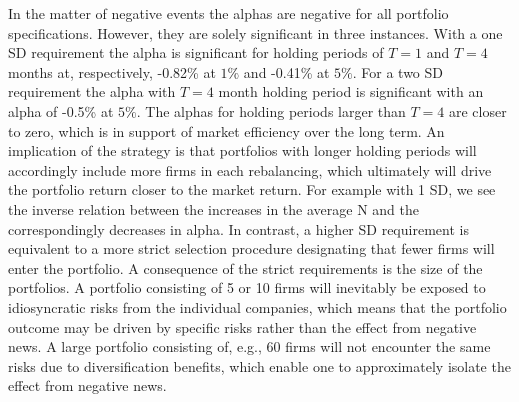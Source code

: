 In the matter of negative events the alphas are negative for all portfolio specifications. However, they are solely significant in three instances. With a one SD requirement the alpha is significant for holding periods of $T = 1$ and $T = 4$ months at, respectively, -0.82\% at $1\%$ and -0.41\% at $5\%$. For a two SD requirement the alpha with $T=4$ month holding period is significant with an alpha of -0.5\% at $5\%$. The alphas for holding periods larger than $T = 4$ are closer to zero, which is in support of market efficiency over the long term. An implication of the strategy is that portfolios with longer holding periods will accordingly include more firms in each rebalancing, which ultimately will drive the portfolio return closer to the market return. For example with 1 SD, we see the inverse relation between the increases in the average N and the correspondingly decreases in alpha. In contrast, a higher SD requirement is equivalent to a more strict selection procedure designating that fewer firms will enter the portfolio. A consequence of the strict requirements is the size of the portfolios. A portfolio consisting of 5 or 10 firms will inevitably be exposed to idiosyncratic risks from the individual companies, which means that the portfolio outcome may be driven by specific risks rather than the effect from negative news. A large portfolio consisting of, e.g., 60 firms will not encounter the same risks due to diversification benefits, which enable one to approximately isolate the effect from negative news. 


